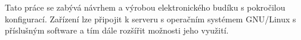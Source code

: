 Tato práce se zabývá návrhem a výrobou elektronického budíku s pokročilou
konfigurací. Zařízení lze připojit k serveru s operačním systémem GNU/Linux
s příslušným software a tím dále rozšířit možnosti jeho využití.

